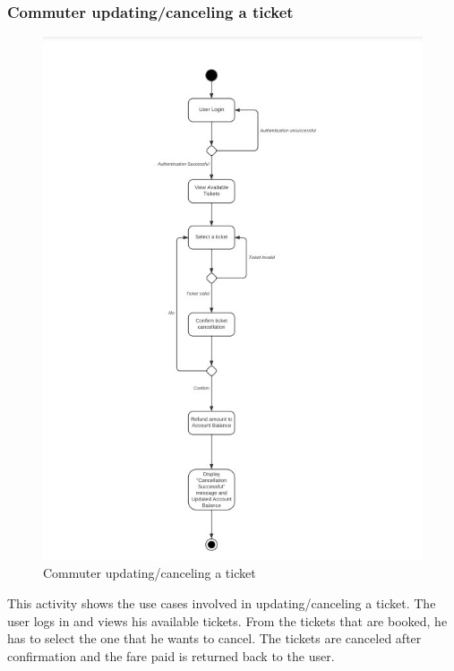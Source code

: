 \documentclass{article}
\begin{document}
 \subsubsection{Commuter updating/canceling a ticket}
     \begin{figure}[h]
        \centering
        \includegraphics[scale=0.5]{update_ticket.jpg}
        \caption{Commuter updating/canceling a ticket}
        \label{fig:updateTicket}
    \end{figure}
    This activity shows the use cases involved in updating/canceling a ticket. The user logs in and views his available tickets. From the tickets that are booked, he has to select the one that he wants to cancel. The tickets are canceled after confirmation and the fare paid is returned back to the user. 
\end{document}
